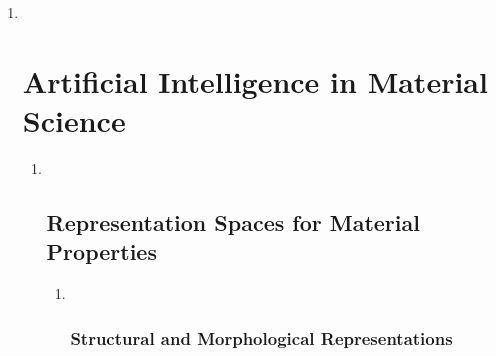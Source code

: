\documentclass[
]{article}
\begin{document}
\begin{enumerate}
\def\labelenumi{\arabic{enumi}.}
\setcounter{enumi}{3}
\item ~
  \hypertarget{artificial-intelligence-in-material-science}{%
  \section{Artificial Intelligence in Material
  Science}\label{artificial-intelligence-in-material-science}}

  \begin{enumerate}
  \def\labelenumii{\arabic{enumii}.}
  \item ~
    \hypertarget{representation-spaces-for-material-properties}{%
    \subsection{Representation Spaces for Material
    Properties}\label{representation-spaces-for-material-properties}}

    \begin{enumerate}
    \def\labelenumiii{\arabic{enumiii}.}
    \item ~
      \hypertarget{structural-and-morphological-representations}{%
      \subsubsection{Structural and Morphological
      Representations}\label{structural-and-morphological-representations}}
    \end{enumerate}
  \end{enumerate}
\end{enumerate}
\end{document}
